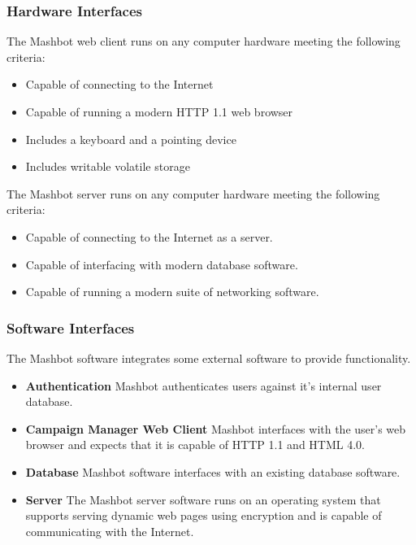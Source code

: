 \documentclass{report}
\begin{document}
		\subsubsection{Hardware Interfaces} %
                The Mashbot web client runs on any computer hardware meeting
                the following criteria:
                \begin{itemize}
                  \item Capable of connecting to the Internet
                  \item Capable of running a modern HTTP 1.1 web browser
                  \item Includes a keyboard and a pointing device
                  \item Includes writable volatile storage
                \end{itemize}
                The Mashbot server runs on any computer hardware meeting
                the following criteria:
                \begin{itemize}
                \item Capable of connecting to the Internet as a server.
                \item Capable of interfacing with modern database software.
                \item Capable of running a modern suite of networking software.
		\end{itemize}

		\subsubsection{Software Interfaces} %
                The Mashbot software integrates some external software
                to provide functionality.
                \begin{itemize}
                \item \textbf{Authentication} Mashbot authenticates users
                  against it's internal user database.
                \item \textbf{Campaign Manager Web Client} Mashbot
                  interfaces with the user’s web browser and expects
                  that it is capable of HTTP 1.1 and HTML 4.0.
                \item \textbf{Database} Mashbot software interfaces
                  with an existing database software.
                \item \textbf{Server} The Mashbot server software runs
                  on an operating system that supports serving dynamic
                  web pages using encryption and is capable of
                  communicating with the Internet.
                \end{itemize}
\end{document}
